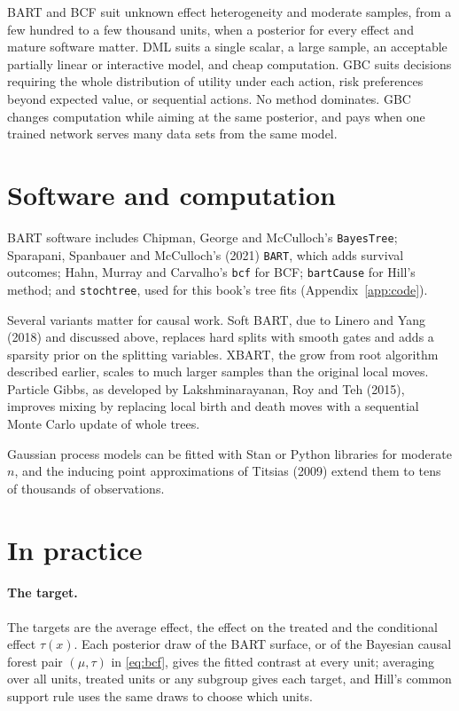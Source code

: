 BART and BCF suit unknown effect heterogeneity and moderate samples, from a few hundred to a few thousand units, when a posterior for every effect and mature software matter. DML suits a single scalar, a large sample, an acceptable partially linear or interactive model, and cheap computation. GBC suits decisions requiring the whole distribution of utility under each action, risk preferences beyond expected value, or sequential actions. No method dominates. GBC changes computation while aiming at the same posterior, and pays when one trained network serves many data sets from the same model.

\section{Software and computation}

BART software includes Chipman, George and McCulloch's \texttt{BayesTree}; Sparapani, Spanbauer and McCulloch's (2021) \texttt{BART}, which adds survival outcomes; Hahn, Murray and Carvalho's \texttt{bcf} for BCF; \texttt{bartCause} for Hill's method; and \texttt{stochtree}, used for this book's tree fits (Appendix~\ref{app:code}).

Several variants matter for causal work. Soft BART, due to Linero and Yang (2018) and discussed above, replaces hard splits with smooth gates and adds a sparsity prior on the splitting variables. XBART, the grow from root algorithm described earlier, scales to much larger samples than the original local moves. Particle Gibbs, as developed by Lakshminarayanan, Roy and Teh (2015), improves mixing by replacing local birth and death moves with a sequential Monte Carlo update of whole trees.

Gaussian process models can be fitted with Stan or Python libraries for moderate $n$, and the inducing point approximations of Titsias (2009) extend them to tens of thousands of observations.



\section{In practice}

\paragraph{The target.} The targets are the average effect, the effect on the treated and the conditional effect $\tau(x)$. Each posterior draw of the BART surface, or of the Bayesian causal forest pair $(\mu, \tau)$ in \eqref{eq:bcf}, gives the fitted contrast at every unit; averaging over all units, treated units or any subgroup gives each target, and Hill's common support rule uses the same draws to choose which units.

